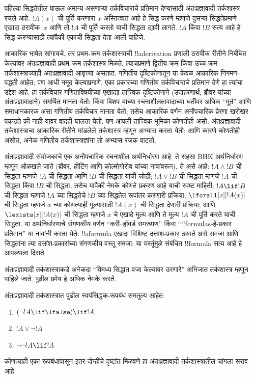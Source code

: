 \documentclass[../../../include/open-logic-section]{subfiles}
\begin{document}
पहिल्या सिद्धतेतील पाऊल अमान्य असणाऱ्या तर्कविचाराचे प्रतिमान देण्यासाठी
अंतःप्रज्ञावादी तर्कशास्त्र रचले आहे. $!A(x)$ ची पूर्ति करणारा $x$ अस्तित्वात
आहे हे सिद्ध करणे म्हणजे दुसऱ्या सिद्धतेप्रमाणे एखादा ठरावीक~$x$ आणि तो
$!A$ ची पूर्ति करतो याची सिद्धता द्यावी लागते. $!A$ किंवा $!B$ सत्य आहे हे
सिद्ध करण्यासाठी त्यांपैकी एकाची सिद्धता देता आली पाहिजे.

आकारिक भाषेत सांगायचे, तर प्रथम-क्रम तर्कशास्त्राची !!a{derivation} प्रणाली
ठरावीक रीतीने निर्बंधित केल्यावर अंतःप्रज्ञावादी प्रथम-क्रम तर्कशास्त्र मिळते.
त्याचप्रमाणे द्वितीय-क्रम किंवा उच्च-क्रम तर्कशास्त्राच्याही अंतःप्रज्ञावादी
आवृत्त्या असतात. गणितीय दृष्टिकोनातून या केवळ आकारिक निगमन-पद्धती आहेत; पण
आधी नमूद केल्याप्रमाणे, एका प्रकारच्या गणितीय तर्कविचाराचे प्रतिमान देणे हा
त्यांचा उद्देश आहे. हा तर्कविचार गणिताविषयीच्या एखाद्या तात्त्विक दृष्टिकोनाने
(उदाहरणार्थ, ब्रौवर यांच्या अंतःप्रज्ञावादाने) समर्थित मानता येतो; किंवा
बिशप यांच्या रचनाशीलतावादाच्या धर्तीवर अधिक “मूर्त” आणि समाधानकारक असा
गणितीय तर्कविचार मानता येतो; तसेच आकारिक वर्णन अनौपचारिक प्रेरणा खरोखर
पकडते की नाही यावर वादही घालता येतो. पण आपली तात्त्विक भूमिका कोणतीही असो,
अंतःप्रज्ञावादी तर्कशास्त्राचा आकारिक रीतीने मांडलेले तर्कशास्त्र म्हणून
अभ्यास करता येतो; आणि कारणे कोणतीही असोत, अनेक गणितीय तर्कशास्त्रज्ञांना तो
अभ्यास रंजक वाटतो.

अंतःप्रज्ञावादी संयोजकांचे एक अनौपचारिक रचनाशील अर्थनिर्धारण आहे. ते सहसा
BHK अर्थनिर्धारण म्हणून ओळखले जाते (ब्रौवर, हीटिंग आणि कोल्मोगोरोव यांच्या
नावांवरून). ते असे आहे: $!A \land !B$ ची सिद्धता म्हणजे $!A$ ची सिद्धता
आणि $!B$ ची सिद्धता यांची जोडी; $!A \lor !B$ ची सिद्धता म्हणजे $!A$ ची
सिद्धता किंवा $!B$ ची सिद्धता, तसेच यांपैकी नेमके कोणते प्रकरण आहे याची स्पष्ट
माहिती; $!A \lif !B$ ची सिद्धता म्हणजे $!A$ च्या सिद्धतेचे $!B$ च्या
सिद्धतेत रूपांतर करणारी प्रक्रिया; $\lforall[x][!A(x)]$ ची सिद्धता म्हणजे
$x$ च्या कोणत्याही मूल्यासाठी $!A(x)$ ची सिद्धता देणारी प्रक्रिया; आणि
$\lexists[x][!A(x)]$ ची सिद्धता म्हणजे $x$ चे एखादे मूल्य आणि ते मूल्य $!A$
ची पूर्ति करते याची सिद्धता. या अर्थनिर्धारणाचे संगणकीय वर्णन
“करी--हॉवर्ड समरूपण” किंवा “!!{formula}s-हे-प्रकार प्रतिमान” या नावांनी करता
येते: !!a{formula} एखादा विशिष्ट दत्तांश-प्रकार ठरवते असे समजा आणि
सिद्धतांना त्या दत्तांश-प्रकारांच्या संगणकीय वस्तू समजा; या वस्तूंमुळे संबंधित
!!{formula} सत्य आहे हे आपल्याला दिसते.

अंतःप्रज्ञावादी तर्कशास्त्राकडे अनेकदा “विमध्य सिद्धांत वजा केल्यावर उरणारे”
अभिजात तर्कशास्त्र म्हणून पाहिले जाते. पुढील प्रमेय हे अधिक नेमके करते.
\begin{thm}
अंतःप्रज्ञावादी तर्कशास्त्रात पुढील स्वयंसिद्धक-रूपबंध समतुल्य आहेत:
\begin{enumerate}
\item $(\lnot !A \lif \lfalse) \lif !A$.
\item $!A \lor \lnot !A$
\item $\lnot \lnot !A \lif !A$
\end{enumerate}
\end{thm}
कोणत्याही एका रूपबंधापासून इतर दोन्हींचे दृष्टांत मिळवणे हा अंतःप्रज्ञावादी
तर्कशास्त्रातील चांगला सराव आहे.
\end{document}
